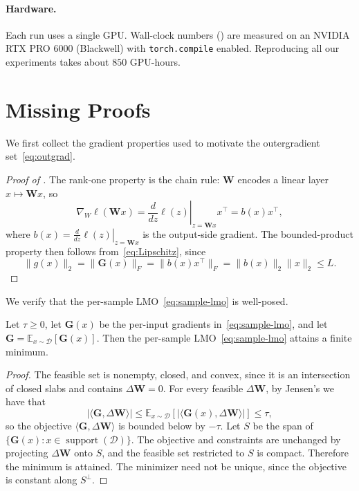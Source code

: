 \documentclass[11pt]{article}
\DeclareMathOperator{\support}{support}
\newcommand{\mat}[1]{\bm{#1}}
\newcommand{\cD}{\mathcal{D}}
\newcommand{\EE}[2]{\mathbb{E}_{#1}\left[#2\right] }
\newcommand{\ip}[1]{\langle #1 \rangle}
\newcommand{\norm}[1]{\| #1\|}
\begin{document}
\paragraph{Hardware.} Each run uses a single GPU. Wall-clock numbers () are measured on an NVIDIA RTX PRO 6000 (Blackwell) with \texttt{torch.compile} enabled. Reproducing all our experiments takes about $850$ GPU-hours.

\newpage



\section{Missing Proofs}
\label{app:proofs}



We first collect the gradient properties used to motivate the outergradient set~\eqref{eq:outgrad}.
\gradprop*
\begin{proof}[Proof of ]
The rank-one property is the chain rule: $\mat{W}$ encodes a linear layer
$x \mapsto \mat{W} x$, so
\[
\nabla_W \ell(\mat{W}x) =  \left. \frac{d }{dz} \ell(z)
\right|_{z =\mat{W}x} x^\top
=b(x)x^\top,
\]
where $b(x) = \left.\frac{d }{dz} \ell(z)  \right|_{z =\mat{W}x}$ is the output-side gradient.
The bounded-product property then follows from~\eqref{eq:Lipschitz}, since
\[
\norm{g(x)}_2=\norm{\mat{G}(x)}_F=\norm{b(x)x^\top}_F=\norm{b(x)}_2\norm{x}_2\le L .
\]
\end{proof}

We verify that the per-sample LMO~\eqref{eq:sample-lmo} is well-posed.
\begin{proposition}
\label{prop:wellposed}
Let $\tau\ge 0$, let $\mat{G}(x)$ be the per-input gradients in~\eqref{eq:sample-lmo}, and let $\mat{G}=\EE{x\sim\cD}{\mat{G}(x)}$. Then the per-sample LMO~\eqref{eq:sample-lmo} attains a finite minimum.
\end{proposition}
\begin{proof}
The feasible set is nonempty, closed, and convex, since it is an intersection of closed slabs and contains $\Delta\mat{W}=0$. For every feasible $\Delta\mat{W}$, by Jensen's we have that 
\[
|\ip{\mat{G},\Delta\mat{W}}|
\le \EE{x\sim\cD}{|\ip{\mat{G}(x),\Delta\mat{W}}|}
\le\tau,
\]
so the objective $\ip{\mat{G},\Delta\mat{W}}$ is bounded below by $-\tau$. Let $S$ be the span of $\{\mat{G}(x):x\in\support(\cD)\}$. The objective and constraints are unchanged by projecting $\Delta\mat{W}$ onto $S$, and the feasible set restricted to $S$ is compact. Therefore the minimum is attained. The minimizer need not be unique, since the objective is constant along $S^\perp$.
\end{proof}
\end{document}
